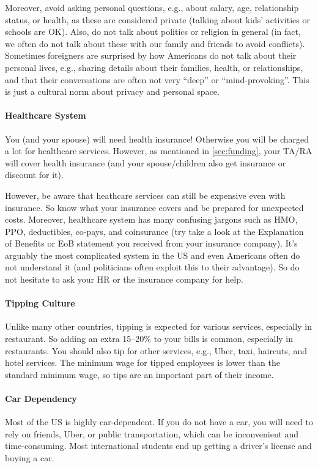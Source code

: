 \documentclass[oneside,11pt,dvipsnames]{book}
\begin{document}
  Moreover, avoid asking personal questions, e.g., about salary, age, relationship status, or health, as these are considered private (talking about kids' activities or schools are OK). Also, do not talk about politics or religion in general (in fact, we often do not talk about these with our family and friends to avoid conflicts).  Sometimes foreigners are surprised by how Americans do not talk about their personal lives, e.g., sharing details about their families, health, or relationships, and that their conversations are often not very ``deep'' or ``mind-provoking''. This is just a cultural norm about privacy and personal space.

  \paragraph{Healthcare System}  You (and your spouse) will need health insurance! Otherwise you will be charged a lot for healthcare services. However, as mentioned in \autoref{sec:funding}, your  TA/RA  will cover health insurance (and your spouse/children also get insurance or discount for it). 
  
  However, be aware that heathcare services can still be expensive even with insurance. So  know what your insurance covers and be prepared for unexpected costs.  Moreover, healthcare system has many confusing jargons such as HMO, PPO, deductibles, co-pays, and coinsurance (try take a look at the Explanation of Benefits or EoB statement you received from your insurance company). It's arguably the most complicated system in the US and even Americans often do not understand it (and politicians often exploit this to their advantage).  So do not hesitate to ask your HR or the insurance company for help.
  
  
  \paragraph{Tipping Culture} Unlike many other countries, tipping is expected for various services, especially in restaurant. So adding an extra 15--20\% to your bills is common, especially in restaurants.
  You should also tip for other services, e.g., Uber, taxi, haircuts, and hotel services.  The minimum wage for tipped employees is lower than the standard minimum wage, so tips are an important part of their income.

  \paragraph{Car Dependency} Most of the US is highly car-dependent. If you do not have a car, you will need to rely on friends, Uber, or public transportation, which can be inconvenient and time-consuming. Most international students end up getting a driver's license and buying a car.
\end{document}
